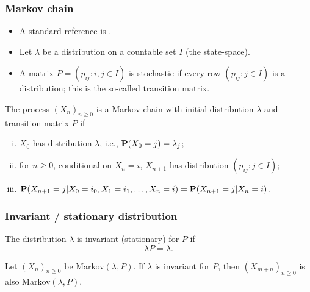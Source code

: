 \documentclass[xcolor=table,10pt]{beamer}
\begin{document}
\begin{frame}
  \frametitle{Markov chain}
  \begin{itemize}
  \item A standard reference is \citep{Norris1998}.
    \item Let $\lambda$ be a \alert{distribution} on a countable set
      $I$ (the \alert{state-space}). 
  \item A matrix $P=(p_{ij}: i,j\in I)$ is \alert{stochastic} if every
    row $(p_{ij}: j\in I)$ is a distribution; this is the so-called
    \alert{transition matrix}. 
  \end{itemize}
  \begin{definition}
    The process $(X_n)_{n\geq 0}$ is a \alert{Markov chain} with
    \alert{initial distribution} $\lambda$ and \alert{transition
      matrix} $P$ if
    \begin{enumerate}[(i)]
    \item $X_0$ has distribution $\lambda$, i.e., ${\bf P}(X_0=j) =
      \lambda_j$; 
    \item for $n\geq 0$, conditional on $X_n=i$, $X_{n+1}$ has
      distribution $(p_{ij}: j\in I)$;
      \item $\displaystyle
        {\bf P}(X_{n+1} = j|X_0=i_0, X_1=i_1, \ldots, X_n=i) =
        {\bf P}(X_{n+1}=j|X_n=i)$. 
    \end{enumerate}
  \end{definition}
\end{frame}

\begin{frame}
  \frametitle{Invariant / stationary distribution}
  \begin{definition}
    The distribution $\lambda$ is \alert{invariant}
    (\alert{stationary}) for $P$ if 
    \begin{equation*}
      \lambda P = \lambda. 
    \end{equation*}
    \vspace*{-\baselineskip}
  \end{definition}

  \begin{theorem}
    Let $(X_n)_{n\geq 0}$ be Markov$(\lambda, P)$. If $\lambda$ is
    invariant for $P$, then $(X_{m+n})_{n\geq 0}$ is also
    Markov$(\lambda, P)$. 
  \end{theorem}
\end{frame}
\end{document}
